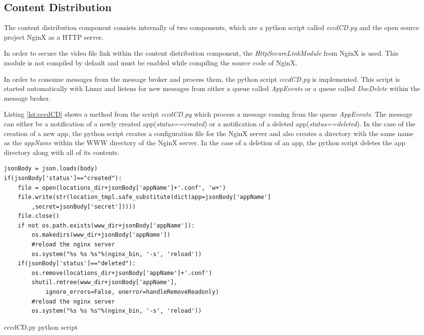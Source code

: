 \subsection{Content Distribution\label{sec:impl_cdn}}
The content distribution component consists internally of two components, which are a python script called \textit{cccdCD.py} and the open source project NginX as a \ac{HTTP} server.

In order to secure the video file link within the content distribution component, the \textit{HttpSecureLinkModule} from NginX is used. This module is not compiled by default and must be enabled while compiling the source code of NginX.

In order to consume messages from the message broker and process them, the python script \textit{cccdCD.py} is implemented. This script is started automatically with Linux and listens for new messages from either a queue called \textit{AppEvents} or a queue called \textit{DocDelete} within the message broker. %

Listing \ref{lst:cccdCD} shows a method from the script \textit{cccdCD.py} which process a message coming from the queue \textit{AppEvents}. The message can either be a notification of a newly created app(\textit{status==created}) or a notification of a deleted app(\textit{status==deleted}). In the case of the creation of a new app, the python script creates a configuration file for the NginX server and also creates a directory with the same name as the \textit{appName} within the WWW directory of the NginX server. In the case of a deletion of an app, the python script deletes the app directory along with all of its contents.
\pagebreak

\begin{code}
\begin{verbatim}
jsonBody = json.loads(body)
if(jsonBody['status']=="created"):
	file = open(locations_dir+jsonBody['appName']+'.conf', 'w+')
	file.write(str(location_tmpl.safe_substitute(dict(app=jsonBody['appName']
		,secret=jsonBody['secret']))))
	file.close()
	if not os.path.exists(www_dir+jsonBody['appName']):
		os.makedirs(www_dir+jsonBody['appName'])
		#reload the nginx server
		os.system("%s %s %s"%(nginx_bin, '-s', 'reload'))
	if(jsonBody['status']=="deleted"):
		os.remove(locations_dir+jsonBody['appName']+'.conf')
		shutil.rmtree(www_dir+jsonBody['appName'], 
			ignore_errors=False, onerror=handleRemoveReadonly)
		#reload the nginx server
		os.system("%s %s %s"%(nginx_bin, '-s', 'reload'))
\end{verbatim}
\caption{cccdCD.py python script}
\label{lst:cccdCD}
\end{code}

